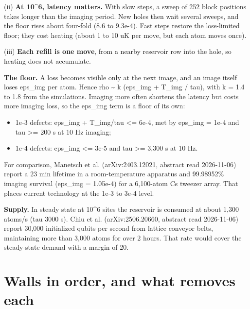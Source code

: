 (ii) \textbf{At 10\^{}6, latency matters.} With slow steps, a sweep of
252 block positions takes longer than the imaging period. New holes then
wait several sweeps, and the floor rises about four-fold (8.6 to
9.3e-4). Fast steps restore the loss-limited floor; they cost heating
(about 1 to 10 uK per move, but each atom moves once).

(iii) \textbf{Each refill is one move}, from a nearby reservoir row into
the hole, so heating does not accumulate.

\textbf{The floor.} A loss becomes visible only at the next image, and
an image itself loses eps\_img per atom. Hence rho \textasciitilde{} k
(eps\_img + T\_img / tau), with k = 1.4 to 1.8 from the simulations.
Imaging more often shortens the latency but costs more imaging loss, so
the eps\_img term is a floor of its own:

\begin{itemize}
\tightlist
\item
  1e-3 defects: eps\_img + T\_img/tau \textless= 6e-4, met by eps\_img =
  1e-4 and tau \textgreater= 200 s at 10 Hz imaging;
\item
  1e-4 defects: eps\_img \textless= 3e-5 and tau \textgreater= 3,300 s
  at 10 Hz.
\end{itemize}

For comparison, Manetsch et al. (arXiv:2403.12021, abstract read
2026-11-06) report a 23 min lifetime in a room-temperature apparatus and
99.98952\% imaging survival (eps\_img = 1.05e-4) for a 6,100-atom Cs
tweezer array. That places current technology at the 1e-3 to 3e-4 level.

\textbf{Supply.} In steady state at 10\^{}6 sites the reservoir is
consumed at about 1,300 atoms/s (tau 3000 s). Chiu et al.
(arXiv:2506.20660, abstract read 2026-11-06) report 30,000 initialized
qubits per second from lattice conveyor belts, maintaining more than
3,000 atoms for over 2 hours. That rate would cover the steady-state
demand with a margin of 20.

\hypertarget{7-walls-in-order-and-what-removes-each}{%
\section{Walls in order, and what removes
each}\label{megascale-7-walls-in-order-and-what-removes-each}}

